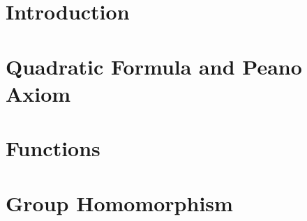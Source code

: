 \documentclass[12pt,openany]{book}
\begin{document}
	
	
	\tableofcontents
	\newpage
	\chapter{Introduction}
	
	
	\chapter{Quadratic Formula and Peano Axiom}
	
	
	\chapter{Functions}
	
	
	\chapter{Group Homomorphism}
	
	
	
	
\end{document}
